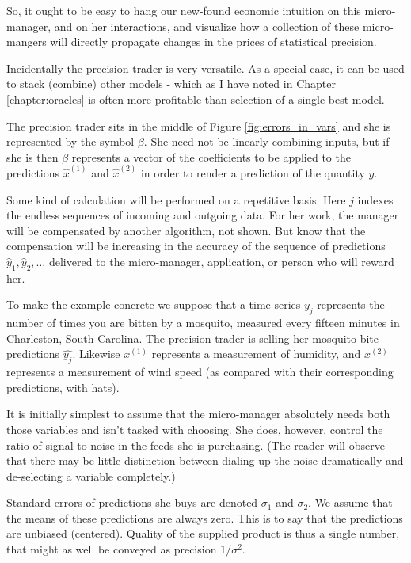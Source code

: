So, it ought to be easy to hang our new-found economic intuition on this micro-manager, and on her interactions, and visualize how a collection of these micro-mangers will directly propagate changes in the prices of statistical precision. 

Incidentally the precision trader is very versatile. As a special case, it can be used to stack (combine) other models - which as I have noted in Chapter \ref{chapter:oracles} is often more profitable than selection of a single best model. 

The precision trader sits in the middle of Figure \ref{fig:errors_in_vars} and she is represented by the symbol $\beta$. She need not be linearly combining inputs, but if she is then $\beta$ represents a vector of the coefficients to be applied to the predictions $\hat{x}^{(1)}$ and $\hat{x}^{(2)}$ in order to render a prediction of the quantity $y$. 

Some kind of calculation will be performed on a repetitive basis. Here $j$ indexes the endless sequences of incoming and outgoing data. For her work, the manager will be compensated by another algorithm, not shown. But know that the compensation will be increasing in the accuracy of the sequence of predictions $\hat{y}_1,\hat{y}_2,\dots $ delivered to the micro-manager, application, or person who will reward her.   

To make the example concrete we suppose that a time series $y_j$ represents the number of times you are bitten by a mosquito, measured every fifteen minutes in Charleston, South Carolina. The precision trader is selling her mosquito bite predictions $\hat{y_j}$. Likewise $x^{(1)}$ represents a measurement of humidity, and $x^{(2)}$ represents a measurement of wind speed (as compared with their corresponding predictions, with hats). 

It is initially simplest to assume that the micro-manager absolutely needs both those variables and isn't tasked with choosing. She does, however, control the ratio of signal to noise in the feeds she is purchasing. (The reader will observe that there may be little distinction between dialing up the noise dramatically and de-selecting a variable completely.)

Standard errors of predictions she buys are denoted $\sigma_1$ and $\sigma_2$. We assume that the means of these predictions are always zero. This is to say that the predictions are unbiased (centered). Quality of the supplied product is thus a single number, that might as well be conveyed as precision $1/\sigma^2$. 

